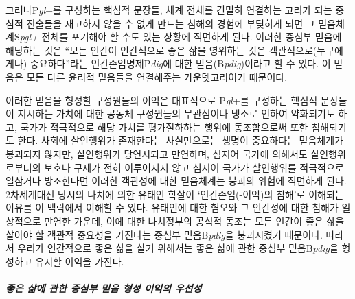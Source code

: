 그러나P\emph{gl}+를 구성하는 핵심적 문장들, 체계 전체를 긴밀히 연결하는 고리가 되는 중심적 진술들을 재고하지 않을 수 없게 만드는 침해의 경험에 부딪히게 되면 그 믿음체계S\emph{pgl+} 전체를 포기해야 할 수도 있는 상황에 직면하게 된다. 이러한 중심부 믿음에 해당하는 것은 ``모든 인간이 인간적으로 좋은 삶을 영위하는 것은 객관적으로(누구에게나) 중요하다''라는 인간존엄명제P\emph{dig}에 대한 믿음(B\emph{pdig})이라고 할 수 있다. 이 믿음은 모든 다른 윤리적 믿음들을 연결해주는 가운뎃고리이기 때문이다.

이러한 믿음을 형성할 구성원들의 이익은 대표적으로 P\emph{gl}+를 구성하는 핵심적 문장들이 지시하는 가치에 대한 공동체 구성원들의 무관심이나 냉소로 인하여 약화되기도 하고, 국가가 적극적으로 해당 가치를 평가절하하는 행위에 동조함으로써 또한 침해되기도 한다. 사회에 살인행위가 존재한다는 사실만으로는 생명이 중요하다는 믿음체계가 붕괴되지 않지만, 살인행위가 당연시되고 만연하며, 심지어 국가에 의해서도 살인행위로부터의 보호나 구제가 전혀 이루어지지 않고 심지어 국가가 살인행위를 적극적으로 일삼거나 방조한다면 이러한 객관성에 대한 믿음체계는 붕괴의 위험에 직면하게 된다. 2차세계대전 당시의 나치에 의한 유태인 학살이 `인간존엄(-이익)의 침해'로 이해되는 이유를 이 맥락에서 이해할 수 있다. 유태인에 대한 혐오와 그 인간성에 대한 침해가 일상적으로 만연한 가운데, 이에 대한 나치정부의 공식적 동조는 모든 인간이 좋은 삶을 살아야 할 객관적 중요성을 가진다는 중심부 믿음B\emph{pdig}을 붕괴시켰기 때문이다. 따라서 우리가 인간적으로 좋은 삶을 살기 위해서는 좋은 삶에 관한 중심부 믿음B\emph{pdig}을 형성하고 유지할 이익을 가진다.

\subparagraph{좋은 삶에 관한 중심부 믿음 형성 이익의 우선성}

